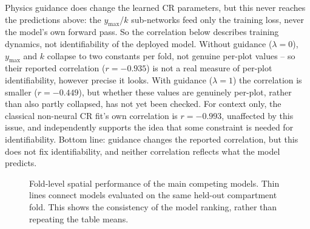Physics guidance does change the learned CR parameters, but this never reaches the predictions
above: the $y_{\max}$/$k$ sub-networks feed only the training loss, never the model's own forward
pass. So the correlation below describes training dynamics, not identifiability of the deployed
model. Without guidance ($\lambda=0$), $y_{\max}$ and $k$ collapse to two constants per fold, not
genuine per-plot values -- so their reported correlation ($r=-0.935$) is not a real measure of
per-plot identifiability, however precise it looks. With guidance ($\lambda=1$) the correlation is
smaller ($r=-0.449$), but whether these values are genuinely per-plot, rather than also partly
collapsed, has not yet been checked. For context only, the classical non-neural CR fit's own
correlation is $r=-0.993$, unaffected by this issue, and independently supports the idea that some
constraint is needed for identifiability. Bottom line: guidance changes the reported correlation,
but this does not fix identifiability, and neither correlation reflects what the model predicts.


\begin{figure}[!htbp]
\centering
{}
\caption{Fold-level spatial performance of the main competing models. Thin lines connect models
evaluated on the same held-out compartment fold. This shows the consistency of the model ranking,
rather than repeating the table means.}
\label{fig:rq1-fold-performance}
\end{figure}

